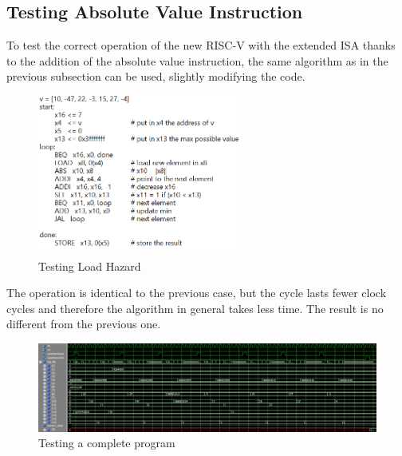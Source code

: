 \subsection{Testing Absolute Value Instruction}
\label{subs:testAbs}
To test the correct operation of the new RISC-V with the extended ISA thanks to the addition of the absolute value instruction, the same algorithm as in the previous subsection can be used, slightly modifying the code.
\begin{figure}[H]
	\centering
	\includegraphics[width=0.6\textwidth]{sec3/images/test9.png}
	\caption{Testing Load Hazard}
	\label{fig:test9}
\end{figure}
\noindent The operation is identical to the previous case, but the cycle lasts fewer clock cycles and therefore the algorithm in general takes less time. The result is no different from the previous one.
\begin{figure}[H]
	\centering
	\includegraphics[width=1\textwidth]{sec3/images/wave_test9_1.png}
	\caption{Testing a complete program}
	\label{fig:wavetest9}
\end{figure}